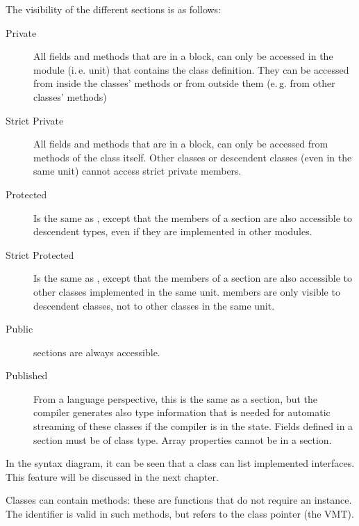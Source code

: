 The visibility of the different sections is as follows:
\begin{description}
\item [Private\ ]  All fields and methods that are in a  block, can
only be accessed in the module (i.\,e. unit) that contains the class definition.
They can be accessed from inside the classes' methods or from outside them
(e.\,g. from other classes' methods)
\item [Strict Private\ ]  All fields and methods that are in a
 block, can only be accessed from methods of the class
itself. Other classes or descendent classes (even in the same unit) cannot
access strict private members.  
\item [Protected\ ] %
Is the same as , except that the members of
a  section are also accessible to descendent types, even if
they are implemented in other modules.
\item [Strict Protected\ ] %
Is the same as , except that the members of
a  section are also accessible to other classes implemented in the
same unit.  members are only visible to descendent
classes, not to other classes in the same unit. 
\item [Public\ ]  sections are always
accessible.
\item [Published\ ]  From a
language perspective, this is the same as a  section, but the compiler generates also type
information that is needed for automatic streaming of these classes if the compiler is in the
 state. Fields defined in a  section must be of class type.
Array properties cannot be in a  section.
\end{description}
In the syntax diagram, it can be seen that a class can list implemented
interfaces. This feature will be discussed in the next chapter.

Classes can contain  methods: these are functions that do not
require an instance. The  identifier is valid in such methods,
but refers to the class pointer (the VMT).

